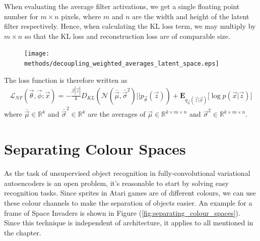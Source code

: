 When evaluating the average filter activations, we get a single floating point number for $m \times n$ pixels, where $m$ and $n$ are the width and height of the latent filter respectively. Hence, when calculating the KL loss term, we may multiply by $m \times n$ so that the KL loss and reconstruction loss are of comparable size.\\

\begin{figure}[H]
\centering
\captionsetup{justification=centering}
\texttt{[image: methods/decoupling\_weighted\_averages\_latent\_space.eps]}
\label{fig:decoupling_weighted_averages_latent_space}
\end{figure}

The loss function is therefore written as 
\begin{align}
\mathcal{L}_{NF}(\vec{\theta}, \vec{\phi}; \vec{x}) = -\frac{\beta |\vec{z}|}{k} D_{KL}(\mathcal{N}(\bar{\vec{\mu}}, \bar{\vec{\sigma}}^2) || p_{\vec{\theta}}(\vec{z})) + \mathbf{E}_{q_{\vec{\phi}}(\vec{z}|\vec{x})}\big[\log p(\vec{x} | \vec{z}) \big]
\end{align}
where $\bar{\vec{\mu}} \in \mathbb{R}^{k}$ and $\bar{\vec{\sigma}}^2 \in \mathbb{R}^{k}$ are the averages of $\vec{\mu} \in \mathbb{R}^{k\times m\times n}$ and $\vec{\sigma}^2\in \mathbb{R}^{k\times m\times n}$.

%
%
%
%
%
\section{Separating Colour Spaces}

As the task of unsupervised object recognition in fully-convolutional variational autoencoders is an open problem, it's reasonable to start by solving easy recognition tasks. Since sprites in Atari games are of different colours, we can use these colour channels to make the separation of objects easier. An example for a frame of Space Invaders is shown in Figure (\ref{fig:separating_colour_spaces}). Since this technique is independent of architecture, it applies to all mentioned in the chapter.


